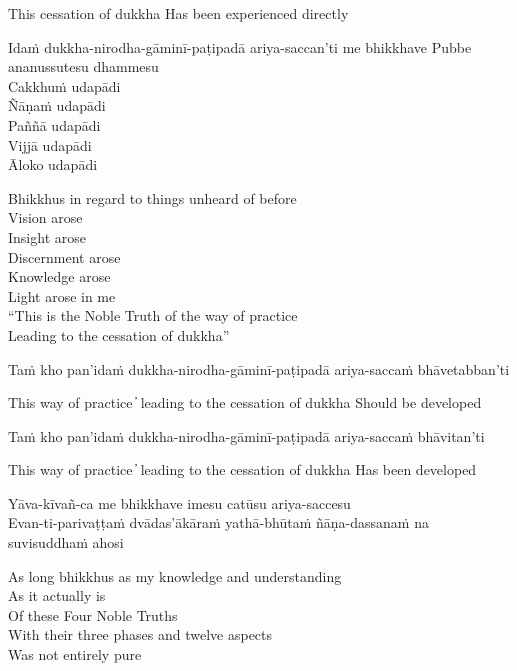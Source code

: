 \begin{cprenglish}
  This cessation of dukkha
  Has been experienced directly
\end{cprenglish}

Idaṁ dukkha-nirodha-gāminī-paṭipadā ariya-saccan’ti me bhikkhave
Pubbe ananussutesu dhammesu\\
Cakkhuṁ udapādi\\
Ñāṇaṁ udapādi\\
Paññā udapādi\\
Vijjā udapādi\\
Āloko udapādi

\begin{cprenglish}
  Bhikkhus in regard to things unheard of before\\
  Vision arose\\
  Insight arose\\
  Discernment arose\\
  Knowledge arose\\
  Light arose in me\\
  “This is the Noble Truth of the way of practice\\
  Leading to the cessation of dukkha”
\end{cprenglish}

Taṁ kho pan’idaṁ dukkha-nirodha-gāminī-paṭipadā ariya-saccaṁ bhāvetabban’ti

\begin{cprenglish}
  This way of practice  ̓  leading to the cessation of dukkha
  Should be developed
\end{cprenglish}

Taṁ kho pan’idaṁ dukkha-nirodha-gāminī-paṭipadā ariya-saccaṁ bhāvitan’ti

\begin{cprenglish}
  This way of practice  ̓  leading to the cessation of dukkha
  Has been developed
\end{cprenglish}

Yāva-kīvañ-ca me bhikkhave imesu catūsu ariya-saccesu\\
Evan-ti-parivaṭṭaṁ dvādas’ākāraṁ yathā-bhūtaṁ ñāṇa-dassanaṁ na suvisuddhaṁ ahosi

\begin{cprenglish}
  As long bhikkhus as my knowledge and understanding\\
  As it actually is\\
  Of these Four Noble Truths\\
  With their three phases and twelve aspects\\
  Was not entirely pure
\end{cprenglish}

